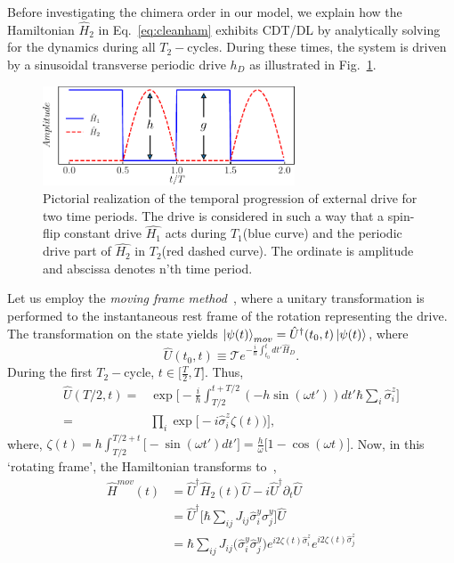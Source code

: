 \documentclass[%
nofootinbib,
reprint,
superscriptaddress,
amsmath,amssymb,showkeys,
aps,
prb,
]{revtex4-2}
\begin{document}
	Before investigating the chimera order in our model, we explain how the Hamiltonian $\hat{H}_2$ in Eq.~\eqref{eq:cleanham} exhibits CDT/DL by analytically solving for the dynamics during all $T_2-$cycles. During these times,  the system is driven by a sinusoidal transverse periodic drive $h_D$ as illustrated in Fig.~\ref{Fig:time_distribution}.
	\begin{figure}
		\begin{center}
			\includegraphics[width=7.5cm]{drive_distribution.pdf}
		\end{center}
		\caption[]{Pictorial realization of the temporal progression of external drive for two time periods. The drive is considered in such a way that a spin-flip constant drive $\hat{H_1}$ acts during $T_1$(blue curve) and the periodic drive part of $\hat{H_2}$ in $T_2$(red dashed curve). The ordinate is amplitude and abscissa denotes n'th time period.}
		\label{Fig:time_distribution}
	\end{figure}	
	Let us employ the \textit{moving frame method}~\cite{haldar_dynamical_2021}, where a unitary transformation is performed to the instantaneous rest frame of the rotation representing the drive. The transformation on the state yields $\ket{\psi(t)}_{mov} = \hat{U}^\dagger(t_0,t) \ket{\psi(t)}$, where 
	\begin{equation}
		\hat{U}(t_0,t) \equiv \mathcal{T} e^{-\frac{i}{\hbar}\int_{t_0}^{t} dt' \hat{H}_D}.
		\label{eq:rot1}
	\end{equation}
	During the first $T_2-$cycle, $t \in{\Big[\frac{T}{2}, T \Big]}$. Thus,
	\begin{align}
		\hat{U}\left(T/2,t\right) =& \exp \Bigg[-\frac{i}{\hbar}\int_{T/2}^{t+T/2} (-h \sin(\omega t'))dt'\hbar\sum_i\hat{\sigma}^z_i\Bigg]\nonumber\\
		=& \prod_{i} \exp\Big[-i \hat{\sigma}^z_i\zeta(t))\Big],
	\end{align}	
	where, $\displaystyle{
		\zeta (t) = h\int_{T/2}^{T/2+t}  \Big[-\sin(\omega t')dt'\Big]=  \frac{h}{\omega}\Big[1-\cos(\omega t)\Big]}$.		
	Now, in this `rotating frame', the Hamiltonian transforms to~\cite{haldar_dynamical_2021},
	\begin{align}
		\hat{H}^{mov}(t) &= \hat{U}^\dagger \hat{H}_2(t) \hat{U}- i \hat{U}^\dagger \partial_t \hat{U}\nonumber\\
		&= \hat{U}^\dagger \big[\hbar\sum_{ij}J_{ij}\hat{\sigma}^y_i\hat{\sigma}^y_j\big] \hat{U}\nonumber\\
		&=\hbar\sum_{ij} J_{ij} \Big(\hat{\sigma}^y_i\hat{\sigma}^y_j\Big) e^{i 2\zeta(t) \hat{\sigma}^z_i}  e^{i 2\zeta(t) \hat{\sigma}^z_j}
		\label{eq:movham}
	\end{align}
\end{document}
